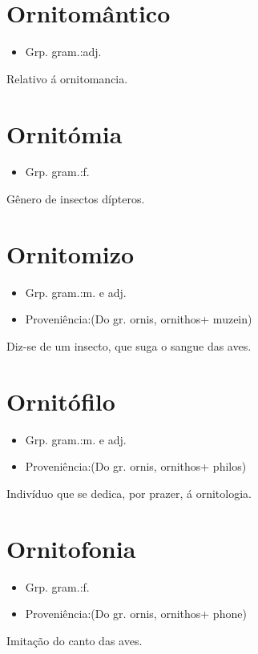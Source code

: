 \section{Ornitomântico}
\begin{itemize}
\item {Grp. gram.:adj.}
\end{itemize}
Relativo á ornitomancia.
\section{Ornitómia}
\begin{itemize}
\item {Grp. gram.:f.}
\end{itemize}
Gênero de insectos dípteros.
\section{Ornitomizo}
\begin{itemize}
\item {Grp. gram.:m.  e  adj.}
\end{itemize}
\begin{itemize}
\item {Proveniência:(Do gr. \textunderscore ornis\textunderscore , \textunderscore ornithos\textunderscore  + \textunderscore muzein\textunderscore )}
\end{itemize}
Diz-se de um insecto, que suga o sangue das aves.
\section{Ornitófilo}
\begin{itemize}
\item {Grp. gram.:m.  e  adj.}
\end{itemize}
\begin{itemize}
\item {Proveniência:(Do gr. \textunderscore ornis\textunderscore , \textunderscore ornithos\textunderscore  + \textunderscore philos\textunderscore )}
\end{itemize}
Indivíduo que se dedica, por prazer, á ornitologia.
\section{Ornitofonia}
\begin{itemize}
\item {Grp. gram.:f.}
\end{itemize}
\begin{itemize}
\item {Proveniência:(Do gr. \textunderscore ornis\textunderscore , \textunderscore ornithos\textunderscore  + \textunderscore phone\textunderscore )}
\end{itemize}
Imitação do canto das aves.
